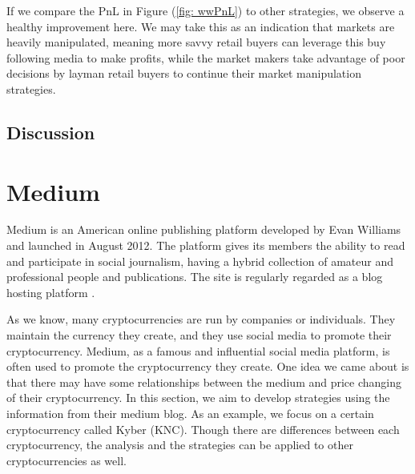 \documentclass[twoside]{report}
\begin{document}
\begin{spacing}{1}
If we compare the PnL in Figure (\ref{fig: wwPnL}) to other strategies, we observe a healthy improvement here. We may take this as an indication that markets are heavily manipulated, meaning more savvy retail buyers can leverage this buy following media to make profits, while the market makers take advantage of poor decisions by layman retail buyers to continue their market manipulation strategies.

\subsection{Discussion}

\section{Medium}\label{sec:medium}
Medium is an American online publishing platform developed by Evan Williams and launched in August 2012. The platform gives its members the ability to read and participate in social journalism, having a hybrid collection of amateur and professional people and publications. The site is regularly regarded as a blog hosting platform \cite{streitfeld2017internet}.




As we know, many cryptocurrencies are run by companies or individuals. They maintain the currency they create, and they use social media to promote their cryptocurrency. Medium, as a famous and influential social media platform, is often used to promote the cryptocurrency they create. One idea we came about is that there may have some relationships between the medium and price changing of their cryptocurrency. In this section, we aim to develop strategies using the information from their medium blog. As an example, we focus on a certain cryptocurrency called Kyber (KNC). Though there are differences between each cryptocurrency, the analysis and the strategies can be applied to other cryptocurrencies as well. 




\end{spacing}
\end{document}

